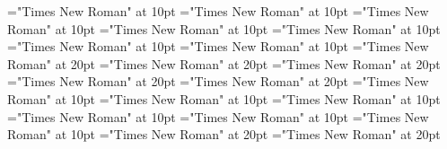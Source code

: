 \documentclass[a4paper]{article}
\begin{document}
 
\pagestyle{plain} 
\font\examplelastoftypearticledictionary="Times New Roman" at 10pt
\font\exampleuselastoftypearticledictionary="Times New Roman" at 10pt
\font\examplefirstoftypearticledictionary="Times New Roman" at 10pt
\font\exampleusefirstoftypearticledictionary="Times New Roman" at 10pt
\font\firstoftypelastoftypenotearticledictionary="Times New Roman" at 10pt
\font{}="Times New Roman" at 10pt
\font\firstoftypegrammarcategorylastoftypearticledictionary="Times New Roman" at 10pt
\font\lastoftypepronunciationenUKarticledictionary="Times New Roman" at 20pt
\font\pronunciationenUSpronunciationbeforearticledictionary="Times New Roman" at 20pt
\font\lastoftypepronunciationenUSarticledictionary="Times New Roman" at 20pt
\font\pronunciationenUKpronunciationbeforearticledictionary="Times New Roman" at 20pt
\font\firstoftypepronunciationenUKarticledictionary="Times New Roman" at 20pt
\font\firstoftypelastoftyperelationsynonymarticledictionary="Times New Roman" at 10pt
\font\firstoftypegrammarrequireslastoftypearticledictionary="Times New Roman" at 10pt
\font\firstoftypeheadwordlastoftypearticledictionary="Times New Roman" at 10pt
\font\articledictionary="Times New Roman" at 10pt
\font\headsectionletterdictionary="Times New Roman" at 10pt
\font\sectionletterdictionary="Times New Roman" at 10pt
\font\pronunciationenUSpronunciationbefore="Times New Roman" at 20pt
\font\pronunciationenUKpronunciationbefore="Times New Roman" at 20pt
\pagestyle{fancy} 


\end{document}
